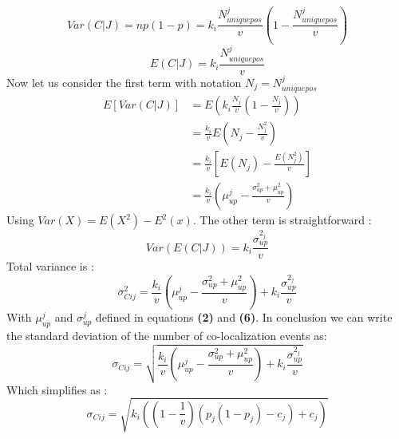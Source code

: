\documentclass{article}
\begin{document}
\[
    Var(C|J) = np(1-p) = k_i \frac{N^j_{uniquepos}}{v}(1-\frac{N^j_{uniquepos}}{v})
\]
\[
    E(C|J) = k_i \frac{N^j_{uniquepos}}{v}
\]
Now let us consider the first term with notation $N_j = N^j_{uniquepos}$
\[
    \begin{split}
    E[Var(C|J)] &= E(k_i \frac{N_j}{v}(1-\frac{N_j}{v})) \\
    &= \frac{k_i}{v}E(N_j - \frac{N^2_j}{v}) \\
    &= \frac{k_i}{v}[E(N_j) - \frac{E(N^2_j)}{v}] \\
    &= \frac{k_i}{v}(\mu^j_{up} - \frac{\sigma^2_{up} + \mu^2_{up}}{v})
\end{split}
\]
Using $Var(X) = E(X^2) - E^2(x)$.\newline
The other term is straightforward : 
\[
Var(E(C|J)) = k_i\frac{\sigma^{2_j}_{up}}{v}
\]
Total variance is :
\[
    \sigma^2_{Cij} = \frac{k_i}{v}(\mu^j_{up} - \frac{\sigma^2_{up} + \mu^2_{up}}{v}) + k_i\frac{\sigma^{2_j}_{up}}{v}
\]
With $\mu^j_{up}$ and $\sigma^j_{up}$ defined in equations \textbf{(2)} and \textbf{(6)}.\newline
In conclusion we can write the standard deviation of the number of co-localization events as:
\begin{equation}
    \sigma_{Cij} = \sqrt{\frac{k_i}{v}(\mu^j_{up} - \frac{\sigma^2_{up} + \mu^2_{up}}{v}) + k_i\frac{\sigma^{2_j}_{up}}{v}}
\end{equation}
Which simplifies as :
\[
    \sigma_{Cij} = \sqrt{k_i((1-\frac{1}{v})(p_j(1-p_j)-c_j)+c_j)}
\]
\end{document}
